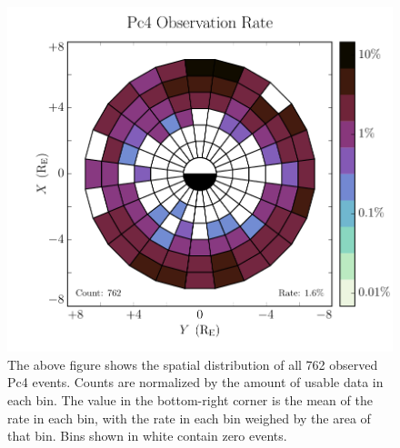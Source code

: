 \documentclass{article}
\begin{document}
\begin{figure}
    \begin{center}
    \includegraphics[width=\textwidth]{figures/fig_all.pdf}
    \caption{
        The above figure shows the spatial distribution of all 762 observed Pc4 events. Counts are normalized by the amount of usable data in each bin. The value in the bottom-right corner is the mean of the rate in each bin, with the rate in each bin weighed by the area of that bin. Bins shown in white contain zero events.
    }
    \label{fig_all}
    \end{center}
\end{figure}

\end{document}

